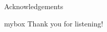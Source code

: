 \documentclass[10pt,aspectratio=43,mathserif,table]{beamer}
\begin{document}
\begin{frame}{Acknowledgements}
	\begin{center}
		\begin{minipage}{1\textwidth}
			\begin{beamercolorbox}[wd=0.70\textwidth, rounded=true, shadow=true]{mybox}
				\LARGE \centering Thank you for listening!  %
			\end{beamercolorbox}
		\end{minipage}
	\end{center}
\end{frame}

\end{document}
